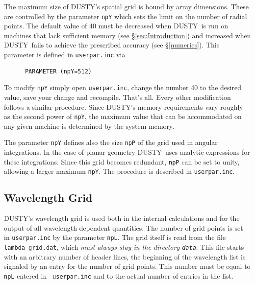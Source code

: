 \documentclass[11pt]{article}
\def\D    {{\sf DUSTY}}
\begin{document}
The maximum size of \D's spatial grid is bound by array
dimensions. These are controlled by the parameter {\tt npY} which sets
the limit on the number of radial points.  The default value of 40
must be decreased when \D\ is run on machines that lack sufficient
memory (see \S\ref{sec:Introduction}) and increased when \D\ fails to
achieve the prescribed accuracy (see \S\ref{numerics}). This parameter
is defined in {\tt userpar.inc} via
\begin{verbatim}
      PARAMETER (npY=512)
\end{verbatim}
To modify {\tt npY} simply open {\tt userpar.inc}, change the number
40 to the desired value, save your change and recompile.  That's all.
Every other modification follows a similar procedure. Since \D's
memory requirements vary roughly as the second power of {\tt npY}, the
maximum value that can be accommodated on any given machine is
determined by the system memory.

The parameter {\tt npY} defines also the size {\tt npP} of the grid
used in angular integrations.  In the case of planar geometry \D\ uses
analytic expressions for these integrations.  Since this grid becomes
redundant, {\tt npP} can be set to unity, allowing a larger maximum
{\tt npY}.  The procedure is described in {\tt userpar.inc}.

\subsection{Wavelength Grid} \label{F-Grid}

\D's wavelength grid is used both in the internal calculations and for
the output of all wavelength dependent quantities. The number of grid
points is set in {\tt userpar.inc} by the parameter {\tt npL}. The
grid itself is read from the file {\tt lambda\_grid.dat}, which
\emph{must always stay in the directory {\tt data}}.  This file starts
with an arbitrary number of header lines, the beginning of the
wavelength list is signaled by an entry for the number of grid
points. This number must be equal to {\tt npL} entered in {\tt
  userpar.inc} and to the actual number of entries in the list.
\end{document}
